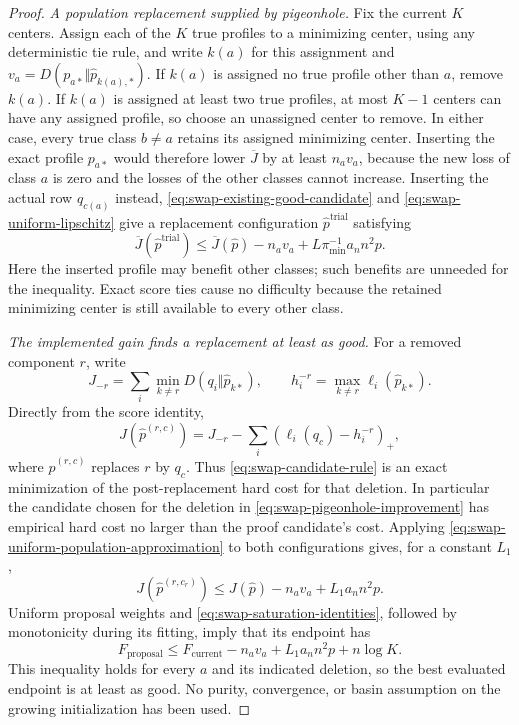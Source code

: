 \begin{proof}
\emph{A population replacement supplied by pigeonhole.}
Fix the current $K$ centers. Assign each of the $K$ true profiles to a
minimizing center, using any deterministic tie rule, and write
$k(a)$ for this assignment and
$v_a=D(p_{a*}\Vert\widehat p_{k(a),*})$.
If $k(a)$ is assigned no true profile other than $a$, remove $k(a)$.
If $k(a)$ is assigned at least two true profiles, at most $K-1$ centers
can have any assigned profile, so choose an unassigned center to remove.
In either case, every true class $b\ne a$ retains its assigned minimizing
center. Inserting the exact profile $p_{a*}$ would therefore lower
$\overline J$ by at least $n_av_a$, because the new loss of class $a$
is zero and the losses of the other classes cannot increase. Inserting
the actual row $q_{c(a)}$ instead, \eqref{eq:swap-existing-good-candidate}
and \eqref{eq:swap-uniform-lipschitz} give a replacement configuration
$\widehat p^{\mathrm{trial}}$ satisfying
\begin{equation}
 \overline J(\widehat p^{\mathrm{trial}})
 \le\overline J(\widehat p)-n_av_a
                  +L\pi_{\min}^{-1}a_n n^2p.
 \label{eq:swap-pigeonhole-improvement}
\end{equation}
Here the inserted profile may benefit other classes; such benefits are
unneeded for the inequality. Exact score ties cause no difficulty because
the retained minimizing center is still available to every other class.

\emph{The implemented gain finds a replacement at least as good.}
For a removed component $r$, write
\[
 J_{-r}=\sum_i\min_{k\ne r}D(q_i\Vert\widehat p_{k*}),
 \qquad
 h_i^{-r}=\max_{k\ne r}\ell_i(\widehat p_{k*}).
\]
Directly from the score identity,
\begin{equation}
 J(\widehat p^{(r,c)})
 =J_{-r}-\sum_i(\ell_i(q_c)-h_i^{-r})_+,
 \label{eq:swap-global-gain-exact}
\end{equation}
where $\widehat p^{(r,c)}$ replaces $r$ by $q_c$. Thus
\eqref{eq:swap-candidate-rule} is an exact minimization of the
post-replacement hard cost for that deletion. In particular the candidate
chosen for the deletion in \eqref{eq:swap-pigeonhole-improvement} has
empirical hard cost no larger than the proof candidate's cost. Applying
\eqref{eq:swap-uniform-population-approximation} to both configurations
gives, for a constant $L_1$,
\[
 J(\widehat p^{(r,c_r)})
 \le J(\widehat p)-n_av_a+L_1a_n n^2p.
\]
Uniform proposal weights and \eqref{eq:swap-saturation-identities},
followed by monotonicity during its fitting, imply that its endpoint has
\begin{equation}
 F_{\mathrm{proposal}}
 \le F_{\mathrm{current}}-n_av_a
                  +L_1a_n n^2p+n\log K.
 \label{eq:swap-soft-improvement}
\end{equation}
This inequality holds for every $a$ and its indicated deletion, so the
best evaluated endpoint is at least as good. No purity, convergence,
or basin assumption on the growing initialization has been used.


\end{proof}
